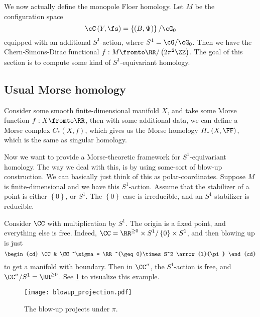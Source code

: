 \documentclass{amsart}
\begin{document}
We now actually define the monopole Floer homology.
Let $M$ be the configuration space 
\begin{equation}
\cC\left( Y , \fs \right) = 
\left\{ \left( B , \Psi \right) \right\} / \cG_0
\end{equation}
equipped with an additional $S^1$-action, where $S^1 = \cG / \cG_0$.
Then we have the Chern-Simons-Dirac functional
$f: M\fromto \RR / \left( 2\pi ^2 \ZZ \right)$.
The goal of this section is to compute some kind of
$S^1$-equivariant homology.

\subsection{Usual Morse homology}

Consider some smooth finite-dimensional manifold $X$, and take some Morse function
$f:X\fromto \RR$, then with some additional data, we can define a Morse
complex $C_*\left( X , f \right)$, which gives us the Morse homology
$H_*\left( X , \FF \right)$, which is the same as singular homology.

Now we want to provide a Morse-theoretic framework for $S^1$-equivariant homology.
The way we deal with this, is by using some-sort of blow-up construction. 
We can basically just think of this as polar-coordinates. 
Suppose $M$ is finite-dimensional and we have this $S^1$-action. 
Assume that the stabilizer of a point is either $\left\{ 0 \right\}$, or $S^1$.
The $\left\{ 0 \right\}$ case is irreducible, and an $S^1$-stabilizer is reducible.

\begin{exm}
Consider $\CC$ with multiplication by $S^1$. 
The origin is a fixed point, and everything else is free. 
Indeed, $\CC = \RR^{\geq 0}\times S^1 / \left\{ 0 \right\}\times S^1$, 
and then blowing up is just
\begin{equation}
\begin{cd}
\CC&
\CC^\sigma = \RR^{\geq 0}\times S^2
\arrow{l}{\pi}
\end{cd}
\end{equation}
to get a manifold with boundary.
Then in $\CC^\sigma$, the $S^1$-action is free, and $\CC^\sigma / S^1 = \RR^{\geq 0}$.
See \cref{fig:blowup_projection} to visualize this example.
\begin{figure}
\texttt{[image: blowup\_projection.pdf]}
\caption{The blow-up projects under $\pi$.}
\label{fig:blowup_projection}
\end{figure}
\end{exm}
\end{document}
